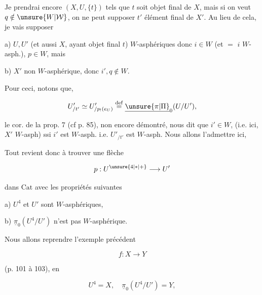 
Je prendrai encore $(X,U,\{t\})$ tels que $t$ soit objet final de $X$, mais si on veut $q\notin\unsure{W|\mathcal W}$, on ne peut supposer $t'$ élément final de $X'$. Au lieu de cela, je vais supposer

a) $U,U'$ (et aussi $X$, ayant objet final $t$) $W$-asphériques donc  $i\in W$ (et $=$ $i$ $W$-asph.), $p\in W$, mais

b) $X'$ non $W$-asphérique, donc $i',q\notin W$.

Pour ceci, notons que,

\[
U'_{/t'}\simeq U'_{/p_!(e_U)}\overset{\mathrm{def}}{=}\underline{\unsure{\pi|\Pi}}_0(U/U'),
\]

le cor. de la prop. 7 (cf p. 85), non encore démontré, nous dit que $i'\in W$,  (i.e. ici, $X'$\unsure{,} $W$-asph) ssi $i'$ est $W$-asph. i.e. $U'_{/t'}$ est $W$-asph. Nous allons l'admettre ici,

Tout revient donc à trouver une flèche

\[
p:U^{\unsure{4|*|+}}\longrightarrow U'
\]

dans $\mathrm{Cat}$ avec les propriétés suivantes

a) $U^4$ et $U'$ sont $W$-asphériques,

b) $\underline{\pi}_0(U^4/U')$ n'est pas $W$-asphérique.

Nous allons reprendre l'exemple précédent

\[
f:X\longrightarrow Y
\]

(p. 101 à 103), en 

\[
U^4=X,\quad\underline{\pi}_0(U^4/U')=Y,
\]
